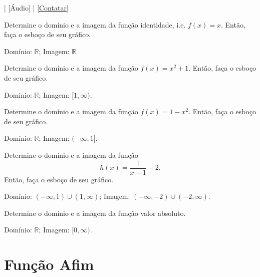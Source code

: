 \begin{flushright}
  [Vídeo] | [Áudio] | \href{https://phkonzen.github.io/notas/contato.html}{[Contatar]}
\end{flushright}

\begin{exer}
  Determine o domínio e a imagem da função identidade, i.e. $f(x) = x$. Então, faça o esboço de seu gráfico.
\end{exer}
\begin{resp}
  Domínio: $\mathbb{R}$; Imagem: $\mathbb{R}$
\end{resp}

\begin{exer}
  Determine o domínio e a imagem da função $f(x) = x^2 + 1$. Então, faça o esboço de seu gráfico.
\end{exer}
\begin{resp}
  Domínio: $\mathbb{R}$; Imagem: $[1, \infty)$.
\end{resp}

\begin{exer}
  Determine o domínio e a imagem da função $f(x) = 1 - x^2$. Então, faça o esboço de seu gráfico.
\end{exer}
\begin{resp}
  Domínio: $\mathbb{R}$; Imagem: $(-\infty, 1]$.
\end{resp}

\begin{exer}
  Determine o domínio e a imagem da função
  \begin{equation}
    h(x) = \frac{1}{x-1} - 2.
  \end{equation}
  Então, faça o esboço de seu gráfico.
\end{exer}
\begin{resp}
  Domínio: $(-\infty, 1)\cup (1, \infty)$; Imagem: $(-\infty, -2)\cup (-2, \infty)$.
\end{resp}

\begin{exer}
  Determine o domínio e a imagem da função valor absoluto.
\end{exer}
\begin{resp}
  Domínio: $\mathbb{R}$; Imagem: $[0, \infty)$.
\end{resp}

\section{Função Afim}\label{cap_funcao_sec_funafim}

